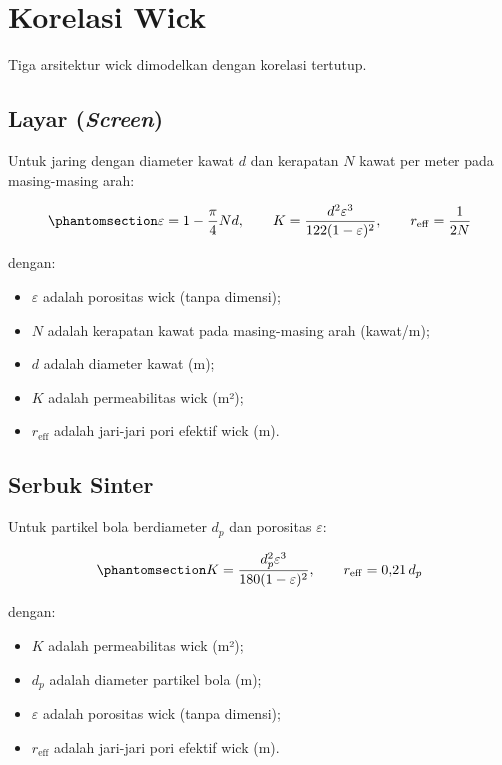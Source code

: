 \documentclass[
  indonesian,
  12pt,
  a4paper,
]{report}
\providecommand{\tightlist}{%
  \setlength{\itemsep}{0pt}\setlength{\parskip}{0pt}}
\begin{document}
\section{Korelasi Wick}\label{korelasi-wick}

Tiga arsitektur wick dimodelkan dengan korelasi tertutup.

\subsection{\texorpdfstring{Layar
(\emph{Screen})}{Layar (Screen)}}\label{layar-screen}

Untuk jaring dengan diameter kawat \(d\) dan kerapatan \(N\) kawat per
meter pada masing-masing arah:

\begin{equation}\protect\phantomsection\label{eq-screen}{ \varepsilon = 1-\frac{\pi}{4}Nd, \qquad
   K = \frac{d^2\varepsilon^3}{122(1-\varepsilon)^2}, \qquad
   r_{\mathrm{eff}} = \frac{1}{2N} }\end{equation}

dengan:

\begin{itemize}
\tightlist
\item
  \(\varepsilon\) adalah porositas wick (tanpa dimensi);
\item
  \(N\) adalah kerapatan kawat pada masing-masing arah (kawat/m);
\item
  \(d\) adalah diameter kawat (m);
\item
  \(K\) adalah permeabilitas wick (m²);
\item
  \(r_{\mathrm{eff}}\) adalah jari-jari pori efektif wick (m).
\end{itemize}

\subsection{Serbuk Sinter}\label{serbuk-sinter}

Untuk partikel bola berdiameter \(d_p\) dan porositas \(\varepsilon\):

\begin{equation}\protect\phantomsection\label{eq-sintered}{ K = \frac{d_p^2\varepsilon^3}{180(1-\varepsilon)^2}, \qquad
   r_{\mathrm{eff}} = 0{,}21\,d_p }\end{equation}

dengan:

\begin{itemize}
\tightlist
\item
  \(K\) adalah permeabilitas wick (m²);
\item
  \(d_p\) adalah diameter partikel bola (m);
\item
  \(\varepsilon\) adalah porositas wick (tanpa dimensi);
\item
  \(r_{\mathrm{eff}}\) adalah jari-jari pori efektif wick (m).
\end{itemize}
\end{document}
